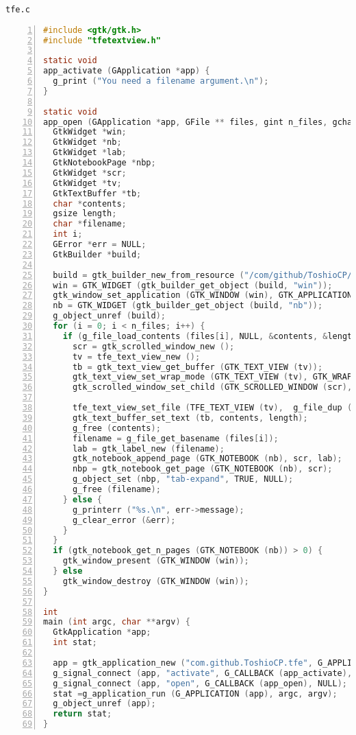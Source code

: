\passthrough{\lstinline!tfe.c!}

\begin{lstlisting}[language=C, numbers=left]
#include <gtk/gtk.h>
#include "tfetextview.h"

static void
app_activate (GApplication *app) {
  g_print ("You need a filename argument.\n");
}

static void
app_open (GApplication *app, GFile ** files, gint n_files, gchar *hint) {
  GtkWidget *win;
  GtkWidget *nb;
  GtkWidget *lab;
  GtkNotebookPage *nbp;
  GtkWidget *scr;
  GtkWidget *tv;
  GtkTextBuffer *tb;
  char *contents;
  gsize length;
  char *filename;
  int i;
  GError *err = NULL;
  GtkBuilder *build;

  build = gtk_builder_new_from_resource ("/com/github/ToshioCP/tfe/tfe.ui");
  win = GTK_WIDGET (gtk_builder_get_object (build, "win"));
  gtk_window_set_application (GTK_WINDOW (win), GTK_APPLICATION (app));
  nb = GTK_WIDGET (gtk_builder_get_object (build, "nb"));
  g_object_unref (build);
  for (i = 0; i < n_files; i++) {
    if (g_file_load_contents (files[i], NULL, &contents, &length, NULL, &err)) {
      scr = gtk_scrolled_window_new ();
      tv = tfe_text_view_new ();
      tb = gtk_text_view_get_buffer (GTK_TEXT_VIEW (tv));
      gtk_text_view_set_wrap_mode (GTK_TEXT_VIEW (tv), GTK_WRAP_WORD_CHAR);
      gtk_scrolled_window_set_child (GTK_SCROLLED_WINDOW (scr), tv);

      tfe_text_view_set_file (TFE_TEXT_VIEW (tv),  g_file_dup (files[i]));
      gtk_text_buffer_set_text (tb, contents, length);
      g_free (contents);
      filename = g_file_get_basename (files[i]);
      lab = gtk_label_new (filename);
      gtk_notebook_append_page (GTK_NOTEBOOK (nb), scr, lab);
      nbp = gtk_notebook_get_page (GTK_NOTEBOOK (nb), scr);
      g_object_set (nbp, "tab-expand", TRUE, NULL);
      g_free (filename);
    } else {
      g_printerr ("%s.\n", err->message);
      g_clear_error (&err);
    }
  }
  if (gtk_notebook_get_n_pages (GTK_NOTEBOOK (nb)) > 0) {
    gtk_window_present (GTK_WINDOW (win));
  } else
    gtk_window_destroy (GTK_WINDOW (win));
}

int
main (int argc, char **argv) {
  GtkApplication *app;
  int stat;

  app = gtk_application_new ("com.github.ToshioCP.tfe", G_APPLICATION_HANDLES_OPEN);
  g_signal_connect (app, "activate", G_CALLBACK (app_activate), NULL);
  g_signal_connect (app, "open", G_CALLBACK (app_open), NULL);
  stat =g_application_run (G_APPLICATION (app), argc, argv);
  g_object_unref (app);
  return stat;
}
\end{lstlisting}

